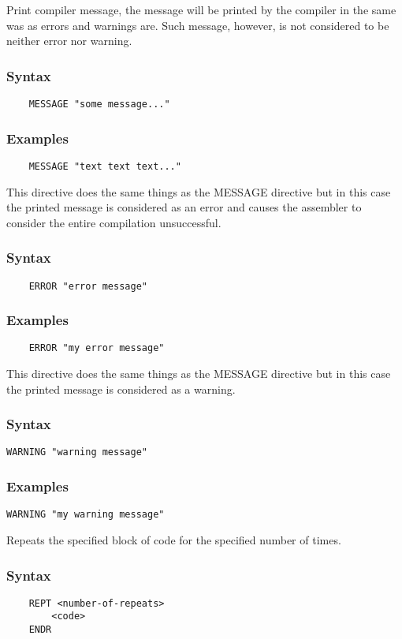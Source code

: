     Print compiler message, the message will be printed by the compiler in the same was as errors and warnings are. Such message, however, is not considered to be neither error nor warning.

    \subsubsection{Syntax}
        \verb'    MESSAGE "some message..."'

    \subsubsection{Examples}
        \verb'    MESSAGE "text text text..."'

    This directive does the same things as the MESSAGE directive but in this case the printed message is considered as an error and causes the assembler to consider the entire compilation unsuccessful.

    \subsubsection{Syntax}
        \verb'    ERROR "error message"'

    \subsubsection{Examples}
        \verb'    ERROR "my error message"'

    This directive does the same things as the MESSAGE directive but in this case the printed message is considered as a warning.

    \subsubsection{Syntax}
        \verb'WARNING "warning message"'

    \subsubsection{Examples}
        \verb'WARNING "my warning message"'

    Repeats the specified block of code for the specified number of times.

    \subsubsection{Syntax}
        \verb'    REPT <number-of-repeats>'\\
        \verb'        <code>'\\
        \verb'    ENDR'

